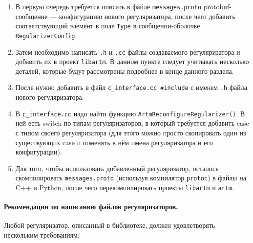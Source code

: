 \begin{enumerate}
	\item В первую очередь требуется описать в файле \verb'messages.proto' protobuf-сообщение ---  конфигурацию нового регуляризатора, после чего добавить соответствующий элемент в поле \verb'Type' в сообщении-оболочке \verb'RegularizerConfig'.
	
	\item Затем необходимо написать \verb'.h' и \verb'.cc' файлы создаваемого регуляризатора и добавить их в проект \verb'libartm'. В данном пункте следует учитывать несколько деталей, которые будут рассмотрены подробнее в конце данного раздела.
	
	\item После нужно добавить в файл \verb'c_interface.cc #include' с именем \verb'.h' файла нового регуляризатора.
	
	\item В  \verb'c_interface.cc' надо найти функцию \verb'ArtmReconfigureRegularizer()'. В ней есть switch по типам регуляризаторов, в который требуется добавить case с типом своего регуляризатора (для этого можно просто скопировать один из существующих case и поменять в нём имена регуляризатора и его конфигурации).
	
	\item Для того, чтобы использовать добавленный регуляризатор, осталось скомпилировать \verb'messages.proto' (используя компилятор \verb'protoc') в файлы на C++ и Python, после чего перекомпилировать проекты \verb'libartm' и \verb'artm'.
\end{enumerate}

\paragraph{Рекомендации по написанию файлов регуляризаторов.} Любой регуляризатор, описанный в библиотеке, должен удовлетворять нескольким требованиям:


